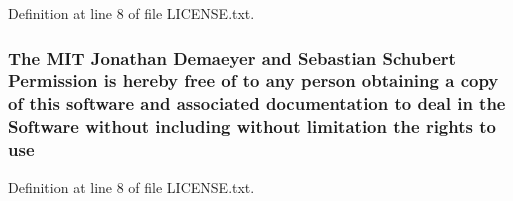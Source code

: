 Definition at line 8 of file L\+I\+C\+E\+N\+S\+E.\+txt.

\subsubsection[{\texorpdfstring{use}{use}}]{\setlength{\rightskip}{0pt plus 5cm}The M\+IT Jonathan Demaeyer and Sebastian Schubert Permission is hereby free of to any person obtaining a {\bf copy} of this software and associated documentation to deal in the {\bf Software} without including without limitation the rights to use}\hypertarget{LICENSE_8txt_a6ca773d794202b7a0332b26f7740ee6e}{}\label{LICENSE_8txt_a6ca773d794202b7a0332b26f7740ee6e}


Definition at line 8 of file L\+I\+C\+E\+N\+S\+E.\+txt.

